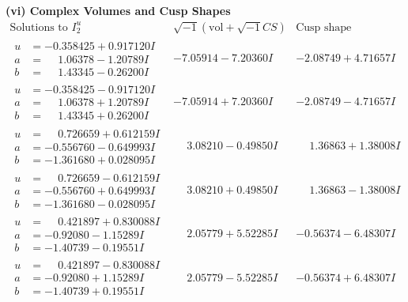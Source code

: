 \documentclass[1p]{elsarticle_modified}
\theoremstyle{definition}
\newcommand{\I}{\sqrt{-1}}
\begin{document}
\newpage\flushleft \textbf{(vi) Complex Volumes and Cusp Shapes}
$$\begin{array}{c|c|c}  
\text{Solutions to }I^u_{2}& \I (\text{vol} + \sqrt{-1}CS) & \text{Cusp shape}\\
 \hline 
\begin{aligned}
u &= -0.358425 + 0.917120 I \\
a &= \phantom{-}1.06378 - 1.20789 I \\
b &= \phantom{-}1.43345 - 0.26200 I\end{aligned}
 & -7.05914 - 7.20360 I & -2.08749 + 4.71657 I \\ \hline\begin{aligned}
u &= -0.358425 - 0.917120 I \\
a &= \phantom{-}1.06378 + 1.20789 I \\
b &= \phantom{-}1.43345 + 0.26200 I\end{aligned}
 & -7.05914 + 7.20360 I & -2.08749 - 4.71657 I \\ \hline\begin{aligned}
u &= \phantom{-}0.726659 + 0.612159 I \\
a &= -0.556760 - 0.649993 I \\
b &= -1.361680 + 0.028095 I\end{aligned}
 & \phantom{-}3.08210 - 0.49850 I & \phantom{-}1.36863 + 1.38008 I \\ \hline\begin{aligned}
u &= \phantom{-}0.726659 - 0.612159 I \\
a &= -0.556760 + 0.649993 I \\
b &= -1.361680 - 0.028095 I\end{aligned}
 & \phantom{-}3.08210 + 0.49850 I & \phantom{-}1.36863 - 1.38008 I \\ \hline\begin{aligned}
u &= \phantom{-}0.421897 + 0.830088 I \\
a &= -0.92080 - 1.15289 I \\
b &= -1.40739 - 0.19551 I\end{aligned}
 & \phantom{-}2.05779 + 5.52285 I & -0.56374 - 6.48307 I \\ \hline\begin{aligned}
u &= \phantom{-}0.421897 - 0.830088 I \\
a &= -0.92080 + 1.15289 I \\
b &= -1.40739 + 0.19551 I\end{aligned}
 & \phantom{-}2.05779 - 5.52285 I & -0.56374 + 6.48307 I \\ \hline\begin{aligned}

\end{aligned}
\end{array}$$
\end{document}
